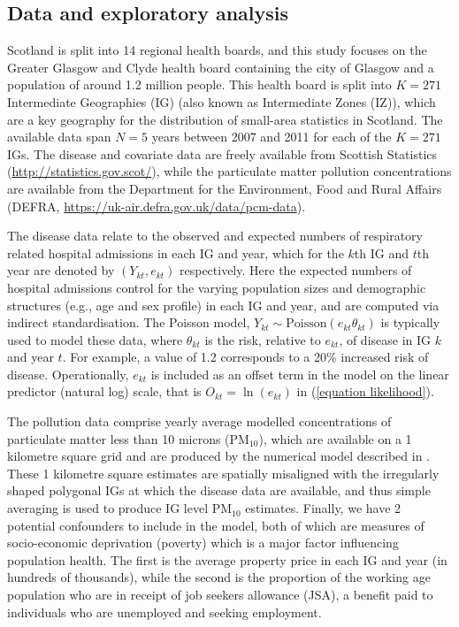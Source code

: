 \documentclass[article, nojss]{jss}
\begin{document}
\subsection{Data and exploratory analysis}
Scotland is split into 14 regional health boards, and this study focuses on the Greater Glasgow and Clyde health board containing  the city of Glasgow and a population of around 1.2 million people. This health board is split into $K=271$ Intermediate Geographies (IG) (also known as Intermediate Zones (IZ)), which are a key geography for the distribution of small-area statistics in Scotland. The available data span $N=5$ years  between 2007 and 2011 for each of the $K=271$ IGs. The disease and covariate data are freely available from Scottish Statistics (\url{http://statistics.gov.scot/}), while the particulate matter pollution concentrations are available from the Department for the Environment, Food and Rural Affairs (DEFRA, \url{https://uk-air.defra.gov.uk/data/pcm-data}).

\hspace{1cm} The disease data relate to the observed and expected numbers of respiratory related hospital admissions in each IG and year, which for the $k$th IG and $t$th year are denoted by $(Y_{kt}, e_{kt})$ respectively. Here the expected numbers of hospital admissions control for the varying population sizes and demographic structures (e.g., age and sex profile) in each IG and year, and are computed via indirect standardisation.  The Poisson  model, $Y_{kt}\sim\mbox{Poisson}(e_{kt}\theta_{kt})$ is typically used to model these data, where $\theta_{kt}$ is the risk, relative to $e_{kt}$, of disease in IG $k$ and year $t$. For example, a value of 1.2 corresponds to a 20\% increased risk of disease. Operationally, $e_{kt}$ is included as an offset term in the model on the linear predictor (natural log) scale, that is $O_{kt}=\ln(e_{kt})$ in (\ref{equation likelihood}). 

\hspace{1cm} The pollution data comprise yearly average modelled concentrations of particulate matter less than 10 microns (PM$_{10}$), which are available on a 1 kilometre square grid and are produced by the numerical  model described in \cite{ricardo2015}. These 1 kilometre square estimates are spatially misaligned with the irregularly shaped polygonal IGs at which the disease  data are available, and thus simple averaging is used to produce IG level PM$_{10}$ estimates. Finally, we have 2 potential confounders to include in the model, both of which are measures of socio-economic deprivation (poverty) which is a major factor influencing population health. The first is the average property price in each IG and year (in hundreds of thousands), while the second is the proportion of the working age population who are in receipt of job seekers allowance (JSA), a benefit paid to individuals who are unemployed and seeking employment.
\end{document}

